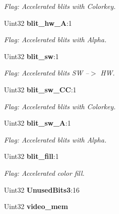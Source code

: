 \begin{DoxyCompactItemize}
\begin{DoxyCompactList}\small\item\em Flag\+: Accelerated blits with Colorkey. \end{DoxyCompactList}\item 
Uint32 {\bf blit\+\_\+hw\+\_\+\+A}\+:1\label{struct_s_d_l___video_info_a2153563e63065ba5a66836ad03f0cd68}

\begin{DoxyCompactList}\small\item\em Flag\+: Accelerated blits with Alpha. \end{DoxyCompactList}\item 
Uint32 {\bf blit\+\_\+sw}\+:1\label{struct_s_d_l___video_info_aa7dc499b5b1bea4bdb4de04bd58fc796}

\begin{DoxyCompactList}\small\item\em Flag\+: Accelerated blits S\+W --$>$ H\+W. \end{DoxyCompactList}\item 
Uint32 {\bf blit\+\_\+sw\+\_\+\+C\+C}\+:1\label{struct_s_d_l___video_info_aafaf9067d0b70d78ec9d58c32895b62e}

\begin{DoxyCompactList}\small\item\em Flag\+: Accelerated blits with Colorkey. \end{DoxyCompactList}\item 
Uint32 {\bf blit\+\_\+sw\+\_\+\+A}\+:1\label{struct_s_d_l___video_info_ad8319697999a5d00f551e2b7547f17aa}

\begin{DoxyCompactList}\small\item\em Flag\+: Accelerated blits with Alpha. \end{DoxyCompactList}\item 
Uint32 {\bf blit\+\_\+fill}\+:1\label{struct_s_d_l___video_info_ab0453880653b45226638e1ee34fceb56}

\begin{DoxyCompactList}\small\item\em Flag\+: Accelerated color fill. \end{DoxyCompactList}\item 
Uint32 {\bfseries Unused\+Bits3}\+:16\label{struct_s_d_l___video_info_a647dc6f87a620ac1f4d7075a0f7063c7}

\item 
Uint32 {\bf video\+\_\+mem}\label{struct_s_d_l___video_info_ab706d6c856b170f8da28786e98fb5de3}


\end{DoxyCompactItemize}
